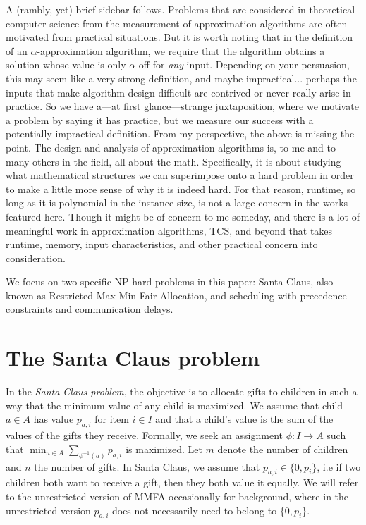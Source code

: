 A (rambly, yet) brief sidebar follows.
Problems that are considered in theoretical computer science from the measurement of approximation algorithms 
are often motivated from practical situations. 
But it is worth noting that in the definition of an $\alpha$-approximation algorithm, 
we require that the algorithm obtains a solution whose value is only $\alpha$ off for \emph{any} input.
Depending on your persuasion, this may seem like a very strong definition, and maybe impractical... 
perhaps the inputs that make algorithm design difficult are contrived or never really arise in practice. 
So we have a---at first glance---strange juxtaposition, where we motivate a problem by saying it has practice,
but we measure our success with a potentially impractical definition.
From my perspective, the above is missing the point. 
The design and analysis of approximation algorithms is, to me and to many others in the field, all about the math.
Specifically, it is about studying what mathematical structures we can superimpose onto a hard problem in order to make a little more sense 
of why it is indeed hard. 
For that reason, runtime, so long as it is polynomial in the instance size, is not a large concern in the works featured here.
Though it might be of concern to me someday, and there is a lot of meaningful work in approximation algorithms, TCS, and beyond that 
takes runtime, memory, input characteristics, and other practical concern into consideration.




\bigskip

We focus on two specific NP-hard problems in this paper: Santa Claus, also known as Restricted Max-Min Fair Allocation, and scheduling 
with precedence constraints and communication delays.

\section{The Santa Claus problem}

In the \emph{Santa Claus problem}, the objective is to allocate gifts to children in such a way that the minimum value of any child is maximized. 
We assume that child $a \in A$ has value $p_{a,i}$ for item $i \in I$ and that a child's value is the sum of the values of the gifts they receive. 
Formally, we seek an assignment $\phi: I \rightarrow A$ such that $\min_{a \in A} \sum_{\phi^{-1}(a)} p_{a,i}$ is maximized. 
Let $m$ denote the number of children and $n$ the number of gifts. 
In Santa Claus, we assume that $p_{a,i} \in \{0,p_i\}$, i.e if two children both want to receive a gift, then they both value it equally.
We will refer to the unrestricted version of MMFA occasionally for background, 
where in the unrestricted version $p_{a,i}$ does not necessarily need to belong to $\{0,p_i\}$.

